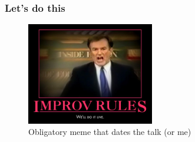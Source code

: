 \documentclass{beamer}
\begin{document}
\begin{frame}[fragile]
  \frametitle{Let's do this}

   \begin{figure}[p]
    \centering
    \includegraphics[width=15em]{well-do-it-live.jpg}
    \caption{Obligatory meme that dates the talk (or me)}
  \end{figure}
  
\end{frame}
\end{document}
